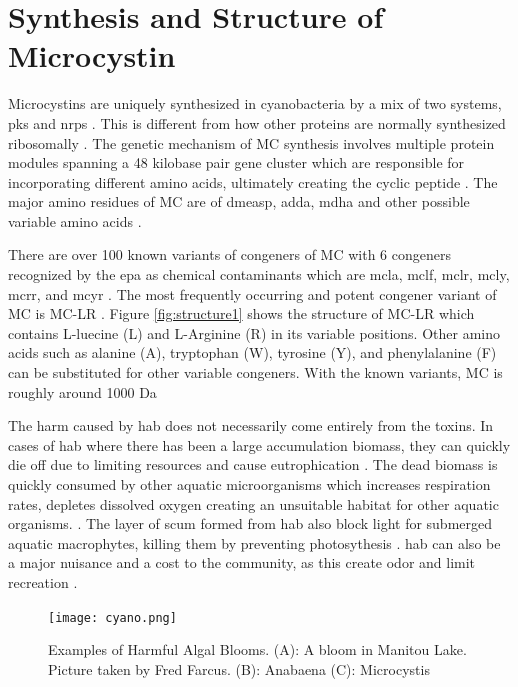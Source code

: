 \section{Synthesis and Structure of Microcystin}
Microcystins are uniquely synthesized in cyanobacteria by a mix of two systems, \gls{pks} and  \gls{nrps} \cite{tillett_structural_2000}. This is different from how other proteins are normally synthesized ribosomally . The genetic mechanism of MC synthesis involves multiple protein modules spanning a 48 kilobase pair gene cluster which are responsible for incorporating different amino acids, ultimately creating the cyclic peptide \cite{moffitt_characterization_2004,nishizawa_genetic_1999}. The major amino residues of MC  are of \gls{dmeasp}, \gls{adda},  \gls{mdha} and other possible variable amino acids \cite{trogen_conformational_1996,nishizawa_genetic_1999}.

There are over 100 known variants of congeners of MC with 6 congeners recognized by the \gls{epa} as chemical contaminants which are \gls{mcla}, \gls{mclf}, \gls{mclr}, \gls{mcly}, \gls{mcrr}, and \gls{mcyr} \cite{puddick_modulation_2016}. The most frequently occurring and potent congener variant of MC is MC-LR \cite{rastogi_cyanotoxin-microcystins:_2014}. Figure \ref{fig:structure1} shows the structure of MC-LR which contains L-luecine (L) and L-Arginine (R) in its variable positions. Other amino acids such as alanine (A), tryptophan (W), tyrosine (Y), and phenylalanine (F) can be substituted for other variable congeners. With the known variants, MC is roughly around 1000 Da \cite{dittmann_cyanobacterial_2012}

The harm caused by \gls{hab} does not necessarily come entirely from the toxins. In cases of \gls{hab} where there has been a large accumulation biomass, they can quickly die off due to limiting resources and cause eutrophication \cite{charlton_oxygen_1980}. The dead biomass is quickly consumed by other aquatic microorganisms which increases respiration rates, depletes dissolved oxygen creating an unsuitable habitat for other aquatic organisms.  \cite{anderson_harmful_2002}. The layer of scum formed from \gls{hab} also block light for submerged aquatic macrophytes, killing them by preventing photosythesis \cite{ bucak_modeling_2018}. \gls{hab} can also be a major nuisance and a cost to the community, as this create odor and limit recreation \cite{graham_cyanotoxin_2010, carmichael_health_2016}.


\begin{figure}[!h]
	\texttt{[image: cyano.png]}
	\caption{
		Examples of Harmful Algal Blooms. (A): A bloom in Manitou Lake. Picture taken by Fred Farcus. (B): Anabaena (C): Microcystis
	}
	\label{fig:cyano}
\end{figure}


